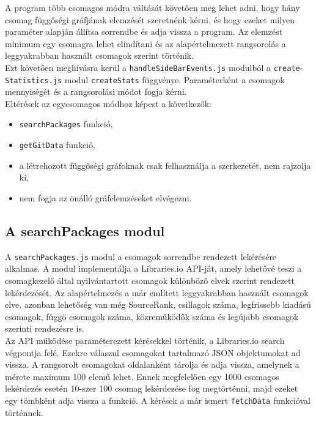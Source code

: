 A program több csomagos módra váltását követően meg lehet adni, hogy hány csomag függőségi gráfjának elemzését szeretnénk kérni, és hogy ezeket milyen paraméter alapján állítsa sorrendbe és adja vissza a program. Az elemzést minimum egy csomagra lehet elindítani és az alapértelmezett rangsorolás a leggyakrabban használt csomagok szerint történik.\\

Ezt követően meghívásra kerül a \texttt{handleSideBarEvents.js} modulból a \texttt{create}-\texttt{Statistics.js} modul \texttt{createStats} függvénye. Paraméterként a csomagok mennyiségét és a rangsorolási módot fogja kérni.\\

\noindent Eltérések az egycsomagos módhoz képest a következők:

\begin{itemize}
	\item \texttt{searchPackages} funkció,
	\item \texttt{getGitData} funkció,
	\item a létrehozott függőségi gráfoknak csak felhasználja a szerkezetét, nem rajzolja ki,
	\item nem fogja az önálló gráfelemzéseket elvégezni.
\end{itemize}

\subsection{A searchPackages modul}

A \texttt{searchPackages.js} modul a csomagok sorrendbe rendezett lekérésére alkalmas. A modul implementálja a Libraries.io API-ját, amely lehetővé teszi a csomagkezelő által nyilvántartott csomagok különböző elvek szerint rendezett lekérdezését. Az alapértelmezés a már említett leggyakrabban használt csomagok elve, azonban lehetőség van még SourceRank, csillagok száma, legfrissebb kiadású csomagok, függő csomagok száma, közreműködők száma és legújabb csomagok szerinti rendezésre is.\\

Az API működése paraméterezett kérésekkel történik, a Libraries.io search végpontja felé. Ezekre válaszul csomagokat tartalmazó JSON objektumokat ad vissza. A rangsorolt csomagokat oldalanként tárolja és adja vissza, amelynek a mérete maximum 100 elemű lehet. Ennek megfelelően egy 1000 csomagos lekérdezés esetén 10-szer 100 csomag lekérdezése fog megtörténni, majd ezeket egy tömbként adja vissza a funkció. A kérések a már ismert \texttt{fetchData} funkcióval történnek.

